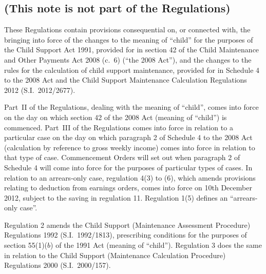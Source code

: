 \documentclass[12pt,a4paper]{article}
\begin{document}
\renewcommand\parthead{— Explanatory Note}

\subsection*{(This note is not part of the Regulations)}

These Regulations contain provisions consequential on, or connected with, the bringing into force of the changes to the meaning of “child” for the purposes of the Child Support Act 1991, provided for in section 42 of the Child Maintenance and Other Payments Act 2008 (c.~6) (“the 2008 Act”), and the changes to the rules for the calculation of child support maintenance, provided for in Schedule 4 to the 2008 Act and the Child Support Maintenance Calculation Regulations 2012 (S.I.~2012/2677).

Part~II of the Regulations, dealing with the meaning of “child”, comes into force on the day on which section 42 of the 2008 Act (meaning of “child”) is commenced. Part~III of the Regulations comes into force in relation to a particular case on the day on which paragraph 2 of Schedule 4 to the 2008 Act (calculation by reference to gross weekly income) comes into force in relation to that type of case. Commencement Orders will set out when paragraph 2 of Schedule 4 will come into force for the purposes of particular types of cases. In relation to an arrears-only case, regulation 4(3) to (6), which amends provisions relating to deduction from earnings orders, comes into force on 10th December 2012, subject to the saving in regulation 11. Regulation 1(5) defines an “arrears-only case”.

Regulation 2 amends the Child Support (Maintenance Assessment Procedure) Regulations 1992 (S.I.~1992/1813), prescribing conditions for the purposes of section 55(1)($b$)  of the 1991 Act (meaning of “child”). Regulation 3 does the same in relation to the Child Support (Maintenance Calculation Procedure) Regulations 2000 (S.I.~2000/157).
\end{document}
